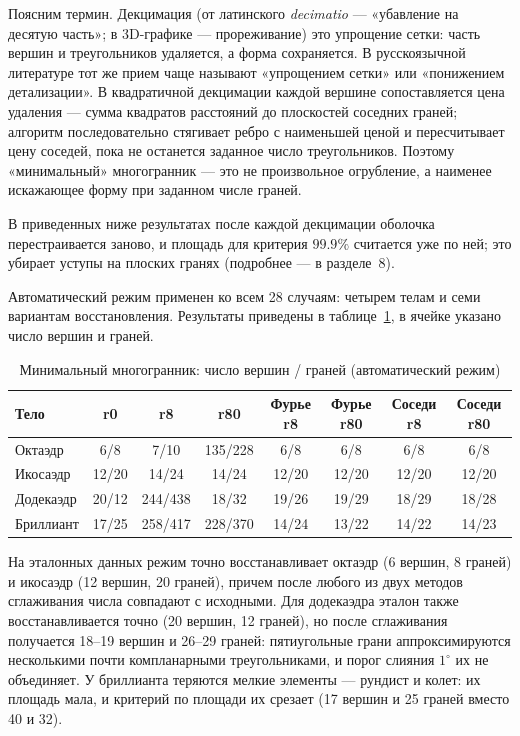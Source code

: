 \documentclass[12pt, a4paper]{article}
\begin{document}
Поясним термин. Декцимация (от латинского \textit{decimatio} --- «убавление на десятую часть»; в 3D-графике --- прореживание) это упрощение сетки: часть вершин и треугольников удаляется, а форма сохраняется. В русскоязычной литературе тот же прием чаще называют «упрощением сетки» или «понижением детализации». В квадратичной декцимации каждой вершине сопоставляется цена удаления --- сумма квадратов расстояний до плоскостей соседних граней; алгоритм последовательно стягивает ребро с наименьшей ценой и пересчитывает цену соседей, пока не останется заданное число треугольников. Поэтому «минимальный» многогранник --- это не произвольное огрубление, а наименее искажающее форму при заданном числе граней.

В приведенных ниже результатах после каждой декцимации оболочка перестраивается заново, и площадь для критерия $99.9\%$ считается уже по ней; это убирает уступы на плоских гранях (подробнее --- в разделе~8).

Автоматический режим применен ко всем 28 случаям: четырем телам и семи вариантам восстановления. Результаты приведены в таблице~\ref{tab:3dmin}, в ячейке указано число вершин и граней.

\begin{table}[H]
\centering
\caption{Минимальный многогранник: число вершин / граней (автоматический режим)}
\label{tab:3dmin}
\footnotesize
\begin{tabular}{|l|c|c|c|c|c|c|c|}
\hline
Тело & r0 & r8 & r80 & Фурье r8 & Фурье r80 & Соседи r8 & Соседи r80 \\
\hline
Октаэдр & 6/8 & 7/10 & 135/228 & 6/8 & 6/8 & 6/8 & 6/8 \\
Икосаэдр & 12/20 & 14/24 & 14/24 & 12/20 & 12/20 & 12/20 & 12/20 \\
Додекаэдр & 20/12 & 244/438 & 18/32 & 19/26 & 19/29 & 18/29 & 18/28 \\
Бриллиант & 17/25 & 258/417 & 228/370 & 14/24 & 13/22 & 14/22 & 14/23 \\
\hline
\end{tabular}
\end{table}

На эталонных данных режим точно восстанавливает октаэдр (6 вершин, 8 граней) и икосаэдр (12 вершин, 20 граней), причем после любого из двух методов сглаживания числа совпадают с исходными. Для додекаэдра эталон также восстанавливается точно (20 вершин, 12 граней), но после сглаживания получается 18--19 вершин и 26--29 граней: пятиугольные грани аппроксимируются несколькими почти компланарными треугольниками, и порог слияния $1^\circ$ их не объединяет. У бриллианта теряются мелкие элементы --- рундист и колет: их площадь мала, и критерий по площади их срезает (17 вершин и 25 граней вместо 40 и 32).
\end{document}
